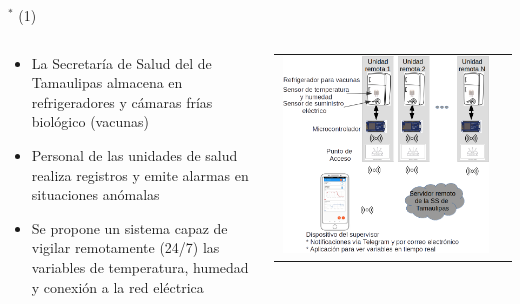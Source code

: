 
\begin{frame}{$^*$ (1)}
\begin{columns}
\begin{column}{0.65\textwidth}
	\begin{itemize}  %
        \item La Secretaría de Salud del de Tamaulipas almacena en refrigeradores y cámaras frías biológico (vacunas)
        \item Personal de las unidades de salud realiza registros y emite alarmas en situaciones anómalas
		\item Se propone un sistema capaz de vigilar remotamente (24/7) las variables de temperatura, humedad y conexión a la red eléctrica
	\end{itemize}
\end{column}
\begin{column}{0.35\textwidth}  
\begin{center}
     \begin{tabular}{cc}
         \includegraphics[width=0.98\textwidth]{2022_RefrigeradoresFrios/figs/SistemaRefrigeradoresFrios}\\         
      \end{tabular}
\end{center}
\end{column} 
\end{columns} 
\end{frame}


